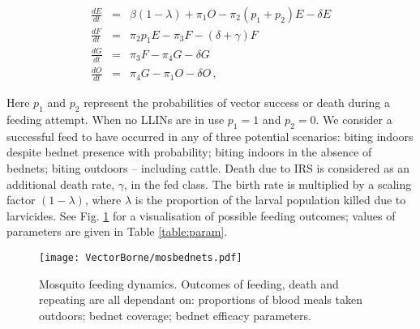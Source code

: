 \begin{eqnarray}
\frac{dE}{dt} &=& \beta(1-\lambda) + \pi_1O - \pi_2(p_1+p_2)E -\delta E \\
\frac{dF}{dt} &=& \pi_2p_1E - \pi_3 F - (\delta+\gamma)F \\
\frac{dG}{dt} &=& \pi_3F - \pi_4G - \delta G \\
\frac{dO}{dt} &=& \pi_4G - \pi_1O - \delta O \,,
\label{eqn:ODE}
\end{eqnarray}

Here $p_1$ and $p_2$ represent the probabilities of vector success or death during a feeding attempt. When no LLINs are in use $p_1=1$ and $p_2=0$. We consider a successful feed to have occurred in any of three potential scenarios: biting indoors despite bednet presence with probability; biting indoors in the absence of bednets; biting outdoors -- including cattle. Death due to IRS is considered as an additional death rate, $\gamma$, in the fed class. The birth rate is multiplied by a scaling factor $(1-\lambda)$, where $\lambda$ is the proportion of the larval population killed due to larvicides. See Fig. \ref{fig:diag_vec} for a visualisation of possible feeding outcomes; values of parameters are given in Table \ref{table:param}. 

\begin{figure}[h]
\begin{center}
\texttt{[image: VectorBorne/mosbednets.pdf]}
\caption{Mosquito feeding dynamics. Outcomes of feeding, death and repeating are all dependant on: proportions of blood meals taken outdoors; bednet coverage; bednet efficacy parameters.}
\label{fig:diag_vec}
\end{center}
\end{figure}

